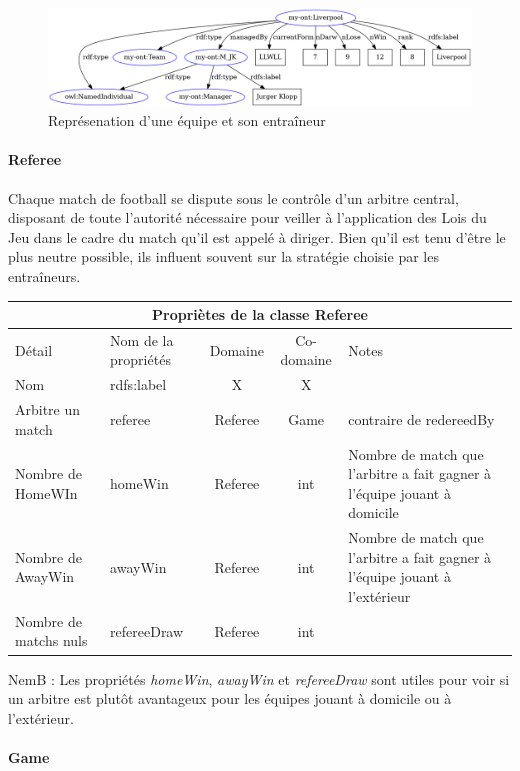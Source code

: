 \documentclass[oneside,13pt,a4paper]{article}
\newcommand\nb[1][0.3]{N\kern-#1emB : }
\begin{document}
\begin{figure}[h]
  \centering
  \includegraphics[width=\textwidth]{img/team.png}
  \caption{Représenation d'une équipe et son entraîneur}
\end{figure}

\paragraph{Referee}

Chaque match de football se dispute sous le contrôle d’un arbitre central, disposant de toute l’autorité nécessaire pour veiller à l’application des Lois du Jeu dans le cadre du match qu’il est appelé à diriger. Bien qu'il est tenu d'être le plus neutre possible, ils influent souvent sur la stratégie choisie par les entraîneurs.

\begin{tabular}{| l | l | c | c | p{3cm} |}
  \hline
  \multicolumn{5}{|c|}{Propriètes de la classe \textbf{Referee}} \\ \hline
  Détail & Nom de la propriétés & Domaine & Co-domaine & Notes \\ \hline
  Nom & rdfs:label  & X  &X  &  \\ \hline
  Arbitre un match & referee & Referee & Game & contraire de redereedBy  \\ \hline
  Nombre de HomeWIn & homeWin & Referee & int  & Nombre de match que l'arbitre a fait gagner à l'équipe jouant à domicile  \\ \hline
  Nombre de AwayWin & awayWin & Referee & int & Nombre de match que l'arbitre a fait gagner à l'équipe jouant à l'extérieur \\ \hline
  Nombre de matchs nuls & refereeDraw & Referee & int &  \\ 
  \hline
\end{tabular}

\nb Les propriétés \textit{homeWin}, \textit{awayWin} et \textit{refereeDraw} sont utiles pour voir si un arbitre est plutôt avantageux pour les équipes jouant à domicile ou à l’extérieur.

\paragraph{Game}
\end{document}
